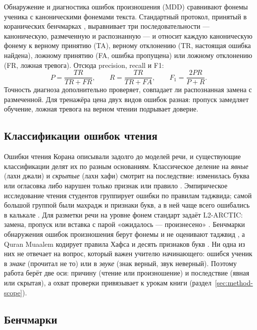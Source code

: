 Обнаружение и диагностика ошибок произношения (MDD) сравнивают фонемы ученика с каноническими фонемами
текста. Стандартный протокол, принятый в коранических
бенчмарках \cite{SRC-004,SRC-031,SRC-066}, выравнивает три последовательности --- каноническую, размеченную и
распознанную --- и относит каждую каноническую фонему к верному принятию (TA), верному отклонению (TR,
настоящая ошибка найдена), ложному принятию (FA, ошибка пропущена) или ложному отклонению (FR, ложная
тревога). Отсюда precision, recall и F1:
\begin{equation}
  P = \frac{TR}{TR+FR},\qquad R = \frac{TR}{TR+FA},\qquad F_1 = \frac{2PR}{P+R}.
\end{equation}
Точность диагноза дополнительно проверяет, совпадает ли распознанная замена с размеченной. Для тренажёра
цена двух видов ошибок разная: пропуск замедляет обучение, ложная тревога на верном чтении подрывает
доверие.

\subsection{Классификации ошибок чтения}

Ошибки чтения Корана описывали задолго до моделей речи, и существующие классификации делят их по разным
основаниям. Классическое деление на \emph{явные} (лахн джали) и \emph{скрытые} (лахн хафи) смотрит на
последствие: изменилась буква или огласовка либо нарушен только признак или правило \cite{SRC-153}. Эмпирическое
исследование чтения студентов группирует ошибки по правилам таджвида; самой большой группой были махрадж и
признаки букв, а в ней чаще всего ошибались в калькале \cite{SRC-152}. Для разметки речи на уровне фонем
стандарт задаёт L2-ARCTIC: замена, пропуск или вставка с парой «ожидалось --- произнесено» \cite{SRC-154}.
Бенчмарки обнаружения ошибок произношения берут фонемы и не оценивают таджвид \cite{SRC-004}, а Quran Muaalem
кодирует правила Хафса и десять признаков букв \cite{SRC-002}. Ни одна из них не отвечает на вопрос, который
важен учителю начинающего: ошибся ученик в \emph{знаке} (прочитал не то) или в \emph{звуке} (знак верный, звук
неверный). Поэтому работа берёт две оси: причину (чтение или произношение) и последствие (явная или скрытая),
а охват проверки привязывает к урокам книги (раздел~\ref{sec:method-scope}).

\subsection{Бенчмарки}

